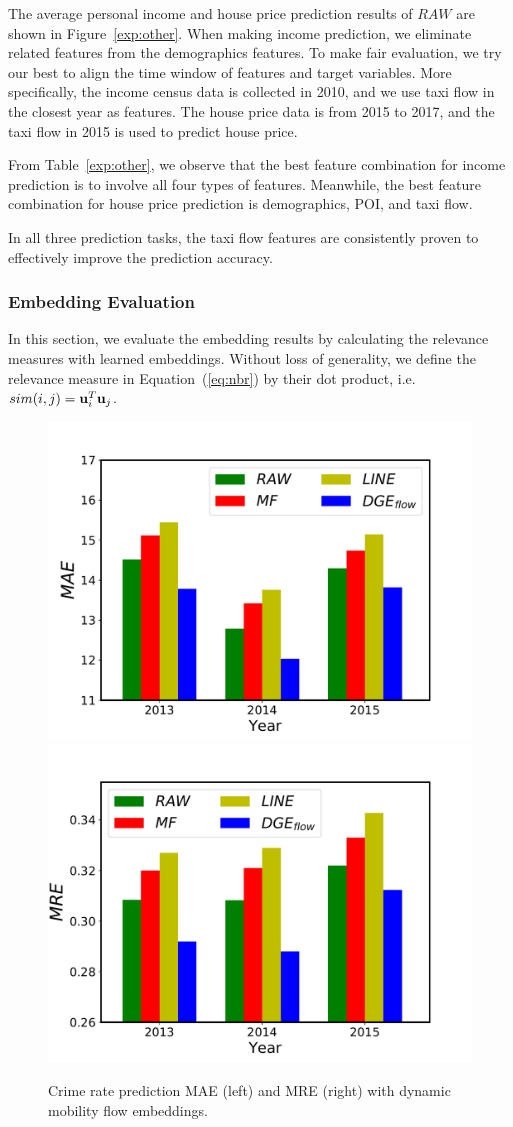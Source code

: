 The average personal income and house price prediction results of $RAW$ are shown in Figure~\ref{exp:other}. When making income prediction, we eliminate related features from the demographics features. To make fair evaluation, we try our best to align the time window of features and target variables. More specifically, the income census data is collected in 2010, and we use taxi flow in the closest year as features. The house price data is from 2015 to 2017, and the taxi flow in 2015 is used to predict house price.

From Table~\ref{exp:other}, we observe that the best feature combination for income prediction is to involve all four types of features. Meanwhile, the best feature combination for house price prediction is demographics, POI, and taxi flow.

In all three prediction tasks, the taxi flow features are consistently proven to effectively improve the prediction accuracy. 



\subsubsection{Embedding Evaluation}

In this section, we evaluate the embedding results by calculating the relevance measures with learned embeddings. Without loss of generality, we define the relevance measure in Equation~(\ref{eq:nbr}) by their dot product, i.e. $sim(i,j) = \mathbf{u}_i^T \mathbf{u}_j$.


\begin{figure}[h]
\centering
\includegraphics[width=0.48\linewidth]{fig/crime-mae.pdf}
\includegraphics[width=0.48\linewidth]{fig/crime-mre.pdf}
\caption{Crime rate prediction MAE (left) and MRE (right) with dynamic mobility flow embeddings.}
\label{fig:crime}
\end{figure}


